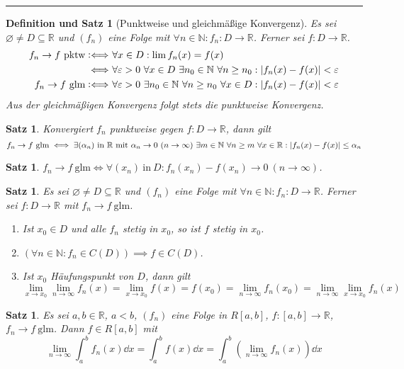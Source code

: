 \documentclass[a4paper]{article}
\newcounter{Sec}
\theoremstyle{marginbreak}
\newtheorem{satz}[definition]{Satz}
\newtheorem{defsatz}[definition]{Definition und Satz}
\newcommand{\sep}{%
	\rule{\textwidth}{0.3pt}%
	\stepcounter{Sec}%
	}
\newcommand{\defiff}{\mathrel{\vcentcolon\Longleftrightarrow}}
\newcommand{\en}{~(n\to\infty)}
\renewcommand{\d}{\dd}
\begin{document}
	\sep
	\begin{defsatz}[Punktweise und gleichmäßige Konvergenz]
		Es sei $\varnothing\neq D\subseteq\mathbb{R}$ und $(f_n)$ eine Folge mit
		$\forall n\in\mathbb{N}:f_n\colon D\to\mathbb{R}$. Ferner sei $f\colon D\to\mathbb{R}$.
		\begin{align*}
			f_n\to f~\text{pktw}
			\defiff&~\forall x\in D:\lim f_n(x)=f(x)\\
			\Longleftrightarrow&~\forall\varepsilon>0~\forall x\in D~\exists n_0\in\mathbb{N}~\forall n\geq n_0:\abs{f_n(x)-f(x)}<\varepsilon\\
			f_n\to f~\text{glm}
			\defiff&~\forall\varepsilon>0~\exists n_0\in\mathbb{N}~\forall n\geq n_0~\forall x\in D:\abs{f_n(x)-f(x)}<\varepsilon
		\end{align*}
		Aus der gleichmäßigen Konvergenz folgt stets die punktweise Konvergenz.
	\end{defsatz}
	\begin{satz}
		Konvergiert $f_n$ punktweise gegen $f\colon D\to\mathbb{R}$, dann gilt
		\[ f_n\to f~\text{glm}\iff\exists(\alpha_n)~\text{in $\mathbb{R}$ mit $\alpha_n\to0\en$}~\exists
		m\in\mathbb{N}~\forall n\geq m~\forall x\in\mathbb{R}:\abs{f_n(x)-f(x)}\leq\alpha_n\]
	\end{satz}
	\begin{satz}
		$f_n\to f~\text{glm}\iff\forall(x_n)~\text{in}~D:f_n(x_n)-f(x_n)\to0\en$.
	\end{satz}
	\begin{satz}
		Es sei $\varnothing\neq D\subseteq\mathbb{R}$ und $(f_n)$ eine Folge mit
		$\forall n\in\mathbb{N}:f_n\colon D\to\mathbb{R}$. Ferner sei $f\colon D\to\mathbb{R}$
		mit $f_n\to f~\text{glm}$.
		\begin{enumerate}[label=(\alph*)]
			\item Ist $x_0\in D$ und alle $f_n$ stetig in $x_0$, so ist $f$ stetig in $x_0$.
			\item $(\forall n\in\mathbb{N}: f_n\in C(D)) \implies f\in C(D)$.
			\item Ist $x_0$ Häufungspunkt von $D$, dann gilt
			\[ \lim_{x\to x_0}\lim_{n\to\infty}f_n(x)=\lim_{x\to x_0}f(x)=f(x_0)=\lim_{n\to\infty}f_n(x_0)=\lim_{n\to\infty}\lim_{x\to x_0}f_n(x) \]
		\end{enumerate}
	\end{satz}
	\begin{satz}
		Es sei $a,b\in\mathbb{R}$, $a<b$, $(f_n)$ eine Folge in $R[a,b]$,
		$f\colon[a,b]\to\mathbb{R}$, $f_n\to f~\text{glm}$. Dann $f\in R[a,b]$ mit
		\[ \lim_{n\to\infty}\int_a^bf_n(x)\d{x}=\int_a^bf(x)\d{x}=\int_a^b(\lim_{n\to\infty}f_n(x))\d{x} \]
	\end{satz}
\end{document}
